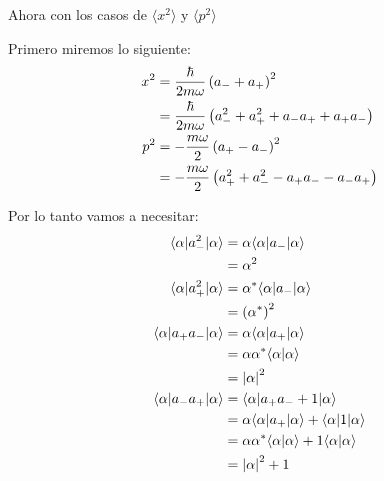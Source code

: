 \documentclass{report}
\begin{document}
Ahora con los casos de $\langle x^2 \rangle$ y $\langle p^2 \rangle$

Primero miremos lo siguiente:
\begin{align*}
  x^2 &= \frac{\hbar}{2m\omega} \left(a_{-} + a_{+}\right)^2\\
  &= \frac{\hbar}{2m\omega} \left(a_{-}^2 + a_{+}^2 + a_- a_+ + a_+a_-\right)\\
  p^2 &= - \frac{m\omega}{2}\left(a_{+} - a_{-}\right)^2\\
  &= - \frac{m\omega}{2}\left(a_{+}^2 + a_{-}^2 - a_+a_- - a_-a_+\right)
\end{align*}

Por lo tanto vamos a necesitar:
\begin{align*}
  \langle \alpha | a_-^2 | \alpha \rangle &= \alpha\langle \alpha | a_- | \alpha \rangle\\
  &= \alpha^2\\
  \langle \alpha | a_+^2 | \alpha \rangle &= \alpha^*\langle \alpha | a_- | \alpha \rangle\\
  &= \left(\alpha^*\right)^2\\
  \langle \alpha | a_+a_- | \alpha \rangle &= \alpha \langle \alpha | a_+ | \alpha \rangle\\
  &= \alpha\alpha^* \langle \alpha | \alpha \rangle\\
  &= \left|\alpha\right|^2\\
  \langle \alpha | a_-a_+ | \alpha \rangle &= \langle \alpha | a_+a_- + 1 | \alpha \rangle\\
  &= \alpha \langle \alpha | a_+ | \alpha \rangle + \langle \alpha | 1 | \alpha \rangle\\
  &= \alpha\alpha^* \langle \alpha | \alpha \rangle + 1 \langle \alpha | \alpha \rangle\\
  &= \left|\alpha\right|^2 + 1
\end{align*}
\end{document}
